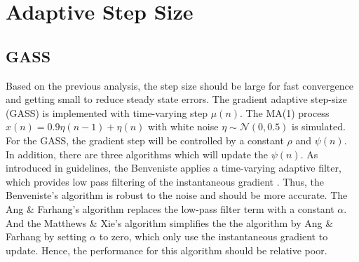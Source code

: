 
\section{Adaptive Step Size}
\subsection{GASS}
Based on the previous analysis, the step size should be large for fast convergence and getting small to reduce steady state errors. The gradient adaptive step-size (GASS) is implemented with time-varying step $\mu(n)$. The MA(1) process $x(n)=0.9\eta(n-1)+\eta(n)$ with white noise $\eta \sim \mathcal{N}(0, 0.5)$ is simulated. For the GASS, the gradient step will be controlled by a constant $\rho$ and $\psi(n)$. In addition, there are three algorithms which will update the $\psi(n)$. As introduced in guidelines, the Benveniste applies a time-varying adaptive filter, which provides low pass filtering of the instantaneous gradient \cite{mandic2009complex}. Thus, the Benveniste's algorithm is robust to the noise and should be more accurate. The Ang \& Farhang's algorithm replaces the low-pass filter term with a constant $\alpha$. And the Matthews \& Xie's algorithm simplifies the the algorithm by Ang \& Farhang by setting $\alpha$ to zero, which only use the instantaneous gradient to update. Hence, the performance for this algorithm should be relative poor.
